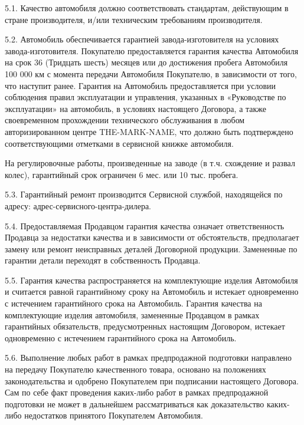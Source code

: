 \documentclass[a4paper,12pt]{article}
\begin{document}
\begin{description}\item5.1. Качество автомобиля должно соответствовать стандартам, действующим в стране производителя, и/или техническим требованиям производителя.\end{description}
\begin{description}\item5.2. Автомобиль обеспечивается гарантией завода-изготовителя на условиях завода-изготовителя. Покупателю предоставляется гарантия качества Автомобиля на срок 36 (Тридцать шесть) месяцев или до достижения пробега Автомобиля 100 000 км с момента передачи Автомобиля Покупателю, в зависимости от того, что наступит ранее. Гарантия на Автомобиль предоставляется при условии соблюдения правил эксплуатации и управления, указанных в «Руководстве по эксплуатации» на автомобиль, в условиях настоящего Договора, а также своевременном прохождении технического обслуживания в любом авторизированном центре THE-MARK-NAME, что должно быть подтверждено соответствующими отметками в сервисной книжке автомобиля. \end{description}
На регулировочные работы, произведенные на заводе (в т.ч. схождение и развал колес), гарантийный срок ограничен 6 мес. или 10 тыс. пробега.
\begin{description}\item5.3. Гарантийный ремонт производится Сервисной службой, находящейся по адресу: адрес-сервисного-центра-дилера.
\end{description}
\begin{description}\item5.4. Предоставляемая Продавцом гарантия качества означает ответственность Продавца за недостатки качества и в зависимости от обстоятельств, предполагает замену или ремонт неисправных деталей Договорной продукции. Замененные по гарантии детали переходят в собственность Продавца.\end{description}
\begin{description}\item5.5. Гарантия качества распространяется на комплектующие изделия Автомобиля и считается равной гарантийному сроку на Автомобиль и истекает одновременно с истечением гарантийного срока на Автомобиль. Гарантия качества на комплектующие изделия автомобиля, замененные Продавцом в рамках гарантийных обязательств, предусмотренных настоящим Договором, истекает одновременно с истечением гарантийного срока на Автомобиль.\end{description}
\begin{description}\item5.6. Выполнение любых работ в рамках предпродажной подготовки направлено на передачу Покупателю качественного товара, основано на положениях законодательства и одобрено Покупателем при подписании настоящего Договора. Сам по себе факт проведения каких-либо работ в рамках предпродажной подготовки не может в дальнейшем рассматриваться как доказательство каких-либо недостатков принятого Покупателем Автомобиля.\end{description}
\end{document}
